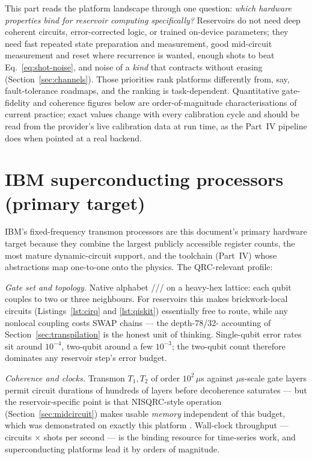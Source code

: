 
\noindent
This part reads the platform landscape through one question: \emph{which
hardware properties bind for reservoir computing specifically?} Reservoirs do
not need deep coherent circuits, error-corrected logic, or trained on-device
parameters; they need fast repeated state preparation and measurement, good
mid-circuit measurement and reset where recurrence is wanted, enough shots to
beat Eq.~\eqref{eq:shot-noise}, and noise of a \emph{kind} that contracts
without erasing (Section~\ref{sec:channels}). Those priorities rank platforms
differently from, say, fault-tolerance roadmaps, and the ranking is
task-dependent. Quantitative gate-fidelity and coherence figures below are
order-of-magnitude characterisations of current practice; exact values change
with every calibration cycle and should be read from the provider's live
calibration data at run time, as the Part~IV pipeline does when pointed at a
real backend.

\section{IBM superconducting processors (primary target)}
\label{sec:hw-ibm}

IBM's fixed-frequency transmon processors are this document's primary
hardware target because they combine the largest publicly accessible
register counts, the most mature dynamic-circuit support, and the toolchain
(Part~IV) whose abstractions map one-to-one onto the physics. The
QRC-relevant profile:

\emph{Gate set and topology.} Native alphabet ///
on a heavy-hex lattice: each qubit couples to two or three neighbours. For
reservoirs this makes brickwork-local circuits (Listings~\ref{lst:cirq} and
\ref{lst:qiskit}) essentially free to route, while any nonlocal coupling
costs SWAP chains --- the depth-78/32- accounting of
Section~\ref{sec:transpilation} is the honest unit of thinking. Single-qubit
error rates sit around $10^{-4}$, two-qubit around a few $10^{-3}$; the
two-qubit count therefore dominates any reservoir step's error budget.

\emph{Coherence and clocks.} Transmon $T_1, T_2$ of order
$10^2\,\mu$s against $\mu$s-scale gate layers permit circuit
durations of hundreds of layers before decoherence saturates --- but the
reservoir-specific point is that NISQRC-style operation
(Section~\ref{sec:midcircuit}) makes usable \emph{memory} independent of
this budget, which was demonstrated on exactly this platform
\citep{hu2024overcoming}. Wall-clock throughput --- circuits
$\times$ shots per second --- is the binding resource for time-series work,
and superconducting platforms lead it by orders of magnitude.

